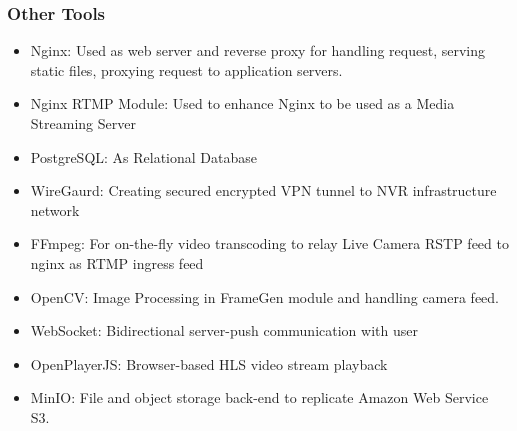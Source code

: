 \subsubsection*{Other Tools}
\begin{itemize}
	\item Nginx: Used as web server and reverse proxy for handling request, serving static files, proxying request to application servers.
	\item Nginx RTMP Module: Used to enhance Nginx to be used as a Media Streaming Server
	\item PostgreSQL: As Relational Database
	\item WireGaurd: Creating secured encrypted VPN tunnel to NVR infrastructure network
	\item FFmpeg: For on-the-fly video transcoding to relay Live Camera RSTP feed to nginx as RTMP ingress feed
	\item OpenCV: Image Processing in FrameGen module and handling camera feed.
	\item WebSocket: Bidirectional server-push communication with user
	\item OpenPlayerJS: Browser-based HLS video stream playback
	\item MinIO: File and object storage back-end to replicate Amazon Web Service S3.
\end{itemize}


